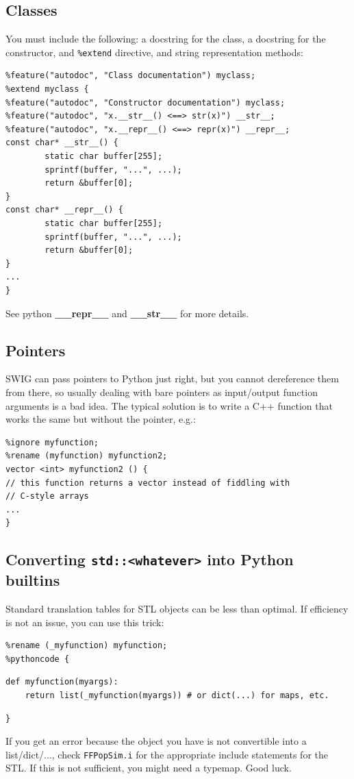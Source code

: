 \documentclass[12pt,a4paper,notitlepage,onecolumn]{article}
\begin{document}
\subsection{Classes}
You must include the following: a docstring for the class, a docstring for the
constructor, and \texttt{\%extend} directive, and string representation methods:
\begin{verbatim}
%feature("autodoc", "Class documentation") myclass;
%extend myclass {
%feature("autodoc", "Constructor documentation") myclass;
%feature("autodoc", "x.__str__() <==> str(x)") __str__;
%feature("autodoc", "x.__repr__() <==> repr(x)") __repr__;
const char* __str__() {
        static char buffer[255];
        sprintf(buffer, "...", ...);
        return &buffer[0];
}
const char* __repr__() {
        static char buffer[255];
        sprintf(buffer, "...", ...);
        return &buffer[0];
}
...
}
\end{verbatim}
See python \textbf{\_\_repr\_\_} and \textbf{\_\_str\_\_} for more details.

\subsection{Pointers}
SWIG can pass pointers to Python just right, but you cannot dereference them
from there, so usually dealing with bare pointers as input/output function
arguments is a bad idea. The typical solution is to write a C++ function that
works the same but without the pointer, e.g.:
\begin{verbatim}
%ignore myfunction;
%rename (myfunction) myfunction2;
vector <int> myfunction2 () {
// this function returns a vector instead of fiddling with
// C-style arrays
...
}
\end{verbatim}

\subsection{Converting \texttt{std::<whatever>} into Python builtins}
Standard translation tables for STL objects can be less than optimal. If
efficiency is not an issue, you can use this trick:
\begin{verbatim}
%rename (_myfunction) myfunction;
%pythoncode {
\end{verbatim}
\vspace{-4ex}
\begin{verbatim}
def myfunction(myargs):
    return list(_myfunction(myargs)) # or dict(...) for maps, etc.
\end{verbatim}
\vspace{-4ex}
\begin{verbatim}
}
\end{verbatim}
If you get an error because the object you have is not convertible into a
list/dict/..., check \texttt{FFPopSim.i} for the appropriate include statements
for the STL. If this is not sufficient, you might need a typemap. Good luck.
\end{document}
